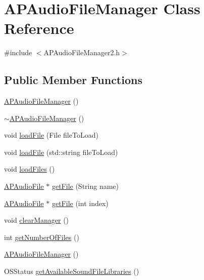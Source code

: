 \hypertarget{class_a_p_audio_file_manager}{\section{A\+P\+Audio\+File\+Manager Class Reference}
\label{class_a_p_audio_file_manager}
}


{\ttfamily \#include $<$A\+P\+Audio\+File\+Manager2.\+h$>$}

\subsection*{Public Member Functions}
\begin{DoxyCompactItemize}
\item 
\hyperlink{class_a_p_audio_file_manager_a3a0dd7cfb1e16412c66f898511d46b34}{A\+P\+Audio\+File\+Manager} ()
\item 
\hyperlink{class_a_p_audio_file_manager_a1a1bb07cf3c8710c695c77cb6cd9baef}{$\sim$\+A\+P\+Audio\+File\+Manager} ()
\item 
void \hyperlink{class_a_p_audio_file_manager_ac07981ccd2caa78533d0399473aac33d}{load\+File} (File file\+To\+Load)
\item 
void \hyperlink{class_a_p_audio_file_manager_ac08c787e5180479048b53e0a5788ae98}{load\+File} (std\+::string file\+To\+Load)
\item 
void \hyperlink{class_a_p_audio_file_manager_a9968679e6778a46b45db09496eaf34ec}{load\+Files} ()
\item 
\hyperlink{class_a_p_audio_file}{A\+P\+Audio\+File} $\ast$ \hyperlink{class_a_p_audio_file_manager_a93197d9a8c4fd221a508713b000d5a98}{get\+File} (String name)
\item 
\hyperlink{class_a_p_audio_file}{A\+P\+Audio\+File} $\ast$ \hyperlink{class_a_p_audio_file_manager_a5d1cfd0ef9052f5185c3d75ae389c869}{get\+File} (int index)
\item 
void \hyperlink{class_a_p_audio_file_manager_a31affbe18da5e74ae2f06c660b62b0dc}{clear\+Manager} ()
\item 
int \hyperlink{class_a_p_audio_file_manager_a29bb102b0dea509bfedb280b0b8b2dac}{get\+Number\+Of\+Files} ()
\item 
\hyperlink{class_a_p_audio_file_manager_a3a0dd7cfb1e16412c66f898511d46b34}{A\+P\+Audio\+File\+Manager} ()
\item 
O\+S\+Status \hyperlink{class_a_p_audio_file_manager_a6d214b9b918cfae6c5ffdbc2ae8d4100}{get\+Available\+Sound\+File\+Libraries} ()
\item 

\end{DoxyCompactItemize}
